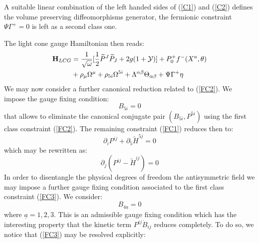 \documentclass[a4paper,12pt]{article}
\def\ds{\displaystyle}
\def\wp{\widetilde{P}}
\def\a{\underline{a}}
\begin{document}
A suitable linear combination of the left handed sides of
(\ref{C1}) and (\ref{C2}) defines the volume preserving
diffeomorphisms generator, the fermionic constraint
$\Psi\Gamma^+=0$ is left as a second class one.

The light cone gauge Hamiltonian then reads:
\begin{equation}\begin{split}
{{\bf{H}}}_{LCG} &=\ds\frac{1}{\sqrt{\omega}}[{1\over
2}\wp^J\wp_J+2g(1+{\cal{Y}})]
+P^+_0f^-(X^a,\theta)\\&+\rho_{\mu}\Omega^{\mu}+\rho_{5i}\Omega^{5i}+\Lambda^{\alpha\beta}
\Theta_{\alpha\beta}+{\Psi\Gamma^+}\eta
\end{split}\label{LCG}
\end{equation}
We may now consider a further canonical reduction related to
(\ref{FC2}). We impose the gauge fixing condition:
\begin{equation}\label{GFonB1}
B_{5i}=0
\end{equation}
that allows to eliminate the canonical conjugate pair
$(B_{5i},P^{5i})$ using the first class constraint (\ref{FC2}).
The remaining constraint (\ref{FC1}) reduces then to:
\begin{equation}\label{}
\partial_iP^{ij}+\partial_5\widetilde{H}^{5j}=0
\end{equation}
which may be rewritten as:
\begin{equation}\label{FC3}
\partial_j(P^{ij}-\widetilde{H}^{ij})=0
\end{equation}
In order to disentangle the physical degrees of freedom the
antisymmetric field we may impose a further gauge fixing condition
associated to the first class constraint (\ref{FC3}). We consider:
\begin{equation}\label{GFonB2}
B_{4{\a}}=0
\end{equation}
where ${\a}=1,2,3$. This is an admissible gauge fixing condition
which has the interesting property that the kinetic term
$P^{ij}\dot{B}_{ij}$ reduces completely. To do so, we notice that
(\ref{FC3}) may be resolved explicitly:
\end{document}
